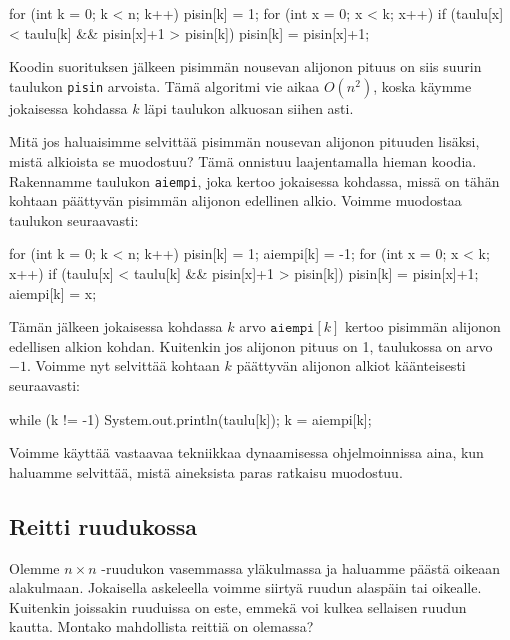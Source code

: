 \begin{code}
for (int k = 0; k < n; k++) {
    pisin[k] = 1;
    for (int x = 0; x < k; x++) {
        if (taulu[x] < taulu[k] && pisin[x]+1 > pisin[k]) {
            pisin[k] = pisin[x]+1;
        }
    }
}
\end{code}

Koodin suorituksen jälkeen pisimmän nousevan alijonon pituus on
siis suurin taulukon \texttt{pisin} arvoista.
Tämä algoritmi vie aikaa $O(n^2)$, koska käym\-me jokaisessa
kohdassa $k$ läpi taulukon alkuosan siihen asti.

Mitä jos haluaisimme selvittää pisimmän nousevan alijonon
pituuden lisäksi, mistä alkioista se muodostuu?
Tämä onnistuu laajentamalla hieman koodia.
Rakennamme taulukon \texttt{aiempi},
joka kertoo jokaisessa kohdassa, missä on tähän kohtaan
päättyvän pisimmän alijonon edellinen alkio.
Voimme muodostaa taulukon seuraavasti:

\begin{code}
for (int k = 0; k < n; k++) {
    pisin[k] = 1;
    aiempi[k] = -1;
    for (int x = 0; x < k; x++) {
        if (taulu[x] < taulu[k] && pisin[x]+1 > pisin[k]) {
            pisin[k] = pisin[x]+1;
            aiempi[k] = x;
        }
    }
}
\end{code}

Tämän jälkeen jokaisessa kohdassa $k$ arvo $\texttt{aiempi}[k]$
kertoo pisimmän alijonon edellisen alkion kohdan.
Kuitenkin jos alijonon pituus on 1, taulukossa on arvo $-1$.
Voimme nyt selvittää kohtaan $k$ päättyvän alijonon alkiot
käänteisesti seuraavasti:

\begin{code}
while (k != -1) {
    System.out.println(taulu[k]);
    k = aiempi[k];
}
\end{code}

Voimme käyttää vastaavaa tekniikkaa
dynaamisessa ohjelmoinnissa aina, kun haluamme
selvittää, mistä aineksista paras ratkaisu muodostuu.

\subsection{Reitti ruudukossa}

Olemme $n \times n$ -ruudukon vasemmassa yläkulmassa ja haluamme
päästä oikeaan alakulmaan.
Jokaisella askeleella voimme siirtyä ruudun alaspäin tai oikealle.
Kuitenkin joissakin ruuduissa on este, emmekä voi kulkea sellaisen
ruudun kautta.
Montako mahdollista reittiä on olemassa?


